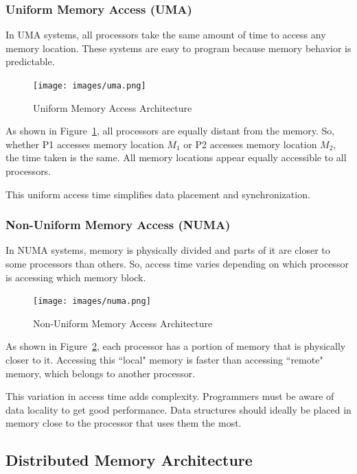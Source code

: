 \documentclass[12pt]{book}
\begin{document}
\subsubsection{Uniform Memory Access (UMA)}

In UMA systems, all processors take the same amount of time to access any memory location. These systems are easy to program because memory behavior is predictable.

\begin{figure}[H]
    \centering
    \texttt{[image: images/uma.png]}
    \caption{Uniform Memory Access Architecture}
    \label{fig:uma}
\end{figure}

As shown in Figure~\ref{fig:uma}, all processors are equally distant from the memory. So, whether P1 accesses memory location $M_1$ or P2 accesses memory location $M_2$, the time taken is the same. All memory locations appear equally accessible to all processors.

This uniform access time simplifies data placement and synchronization.

\subsubsection{Non-Uniform Memory Access (NUMA)}

In NUMA systems, memory is physically divided and parts of it are closer to some processors than others. So, access time varies depending on which processor is accessing which memory block.

\begin{figure}[H]
    \centering
    \texttt{[image: images/numa.png]}
    \caption{Non-Uniform Memory Access Architecture}
    \label{fig:numa}
\end{figure}

As shown in Figure~\ref{fig:numa}, each processor has a portion of memory that is physically closer to it. Accessing this ``local" memory is faster than accessing ``remote" memory, which belongs to another processor.

This variation in access time adds complexity. Programmers must be aware of data locality to get good performance. Data structures should ideally be placed in memory close to the processor that uses them the most.

\subsection{Distributed Memory Architecture}
\end{document}
